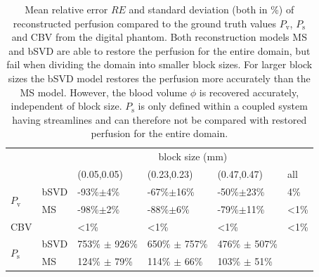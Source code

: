 \documentclass[journal,twocolumn]{IEEEtran}
\newcommand{\Perfv}{P_{\mathrm{v}}}
\newcommand{\Perfs}{P_{\mathrm{s}}}
\begin{document}
	\begin{table}[h!tb]
		\scriptsize
		\caption{Mean relative error $RE$ and standard deviation (both in \%) of reconstructed perfusion compared to the ground truth values $\Perfv$, $\Perfs$ and CBV from the digital phantom. Both reconstruction models MS and bSVD are able to restore the perfusion for the entire domain, but fail when dividing the domain into smaller block sizes. For larger block sizes the bSVD model restores the perfusion more accurately than the MS model. However, the blood volume $\phi$ is recovered accurately, independent of block size. $\Perfs$ is only defined within a coupled system having streamlines and can therefore not be compared with restored perfusion for the entire domain.
		} 
		\centering
		\begin{tabular}{p{.3cm} l l l l l}
			& & \multicolumn{4}{c}{block size (\si{\mm})} \\
										& 		& (0.05,0.05) 		& (0.23,0.23) 	& 	(0.47,0.47)			& all \\ \toprule
			\multirow{2}{*}{$\Perfv$}	& bSVD 	& -93\%$\pm$4\% 	& -67\%$\pm$16\%	& -50\%$\pm$23\%	& 4\% 	\\ 
									   	& MS 	& -98\%$\pm$2\% 	& -88\%$\pm$6\%		& -79\%$\pm$11\%	& <1\% 	\\ \midrule
									CBV & 		& <1\% 				& <1\% 				& <1\% 				& <1\% 	\\ \midrule
			\multirow{2}{*}{$\Perfs$}	& bSVD	& 753\% $\pm$ 926\%	& 650\% $\pm$ 757\%	& 476\% $\pm$ 507\% & 		\\
										& MS 	& 124\% $\pm$ 79\%  & 114\% $\pm$ 66\%	& 103\% $\pm$ 51\% 	& 		\\
		\end{tabular}
		
		\label{tab:resultsSim}
	\end{table}
	
\end{document}
